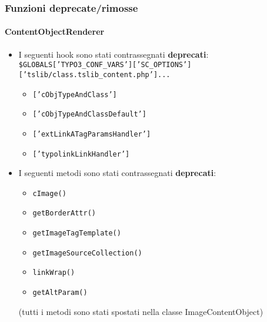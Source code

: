 \begin{frame}[fragile]
	\frametitle{Funzioni deprecate/rimosse}
	\framesubtitle{ContentObjectRenderer}

	\begin{itemize}
		\item I seguenti hook sono stati contrassegnati \textbf{deprecati}:\newline
			\tiny
				\texttt{\$GLOBALS['TYPO3\_CONF\_VARS']['SC\_OPTIONS']['tslib/class.tslib\_content.php']...}
			\normalsize

			\begin{itemize}\smaller
				\item \texttt{['cObjTypeAndClass']}
				\item \texttt{['cObjTypeAndClassDefault']}
				\item \texttt{['extLinkATagParamsHandler']}
				\item \texttt{['typolinkLinkHandler']}
			\end{itemize}

		\item I seguenti metodi sono stati contrassegnati \textbf{deprecati}:

			\begin{itemize}\smaller
				\item \texttt{cImage()}
				\item \texttt{getBorderAttr()}
				\item \texttt{getImageTagTemplate()}
				\item \texttt{getImageSourceCollection()}
				\item \texttt{linkWrap()}
				\item \texttt{getAltParam()}
			\end{itemize}

			\smaller
				(tutti i metodi sono stati spostati nella classe ImageContentObject)
			\normalsize

	\end{itemize}

\end{frame}


